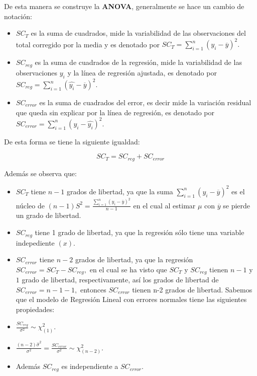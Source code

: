 \documentclass[
  a4paper,
  oneside,
  openany]{book}
\begin{document}
De esta manera se construye la \textbf{ANOVA}, generalmente se hace un cambio de notación:

\begin{itemize}
\item
  \(SC_{T}\) es la suma de cuadrados, mide la variabilidad de las observaciones del total corregido por la media y es denotado por \(SC_{T}=\sum_{i=1}^{n}(y_{i}-\overline{y})^2.\)
\item
  \(SC_{reg}\) es la suma de cuadrados de la regresión, mide la variabilidad de las observaciones \(y_{i}\) y la línea de regresión ajustada, es denotado por \(SC_{reg}=\sum_{i=1}^{n}(\hat{y_{i}}-\overline{y})^2.\)
\item
  \(SC_{error}\) es la suma de cuadrados del error, es decir mide la variación residual que queda sin explicar por la línea de regresión, es denotado por \(SC_{error}=\sum_{i=1}^{n}(y_{i}-\hat{y_{i}})^2.\)
\end{itemize}

De esta forma se tiene la siguiente igualdad:

\[SC_{T}=SC_{reg}+SC_{error}\]

Además se observa que:

\begin{itemize}
\item
  \(SC_{T}\) tiene \(n-1\) grados de libertad, ya que la suma \(\sum_{i=1}^{n}(y_{i}-\overline{y})^2\) es el núcleo de \((n-1)S^2=\frac{\sum_{i=1}^{n}(y_{i}-\overline{y})^2}{n-1}\) en el cual al estimar \(\mu\) con \(\overline{y}\) se pierde un grado de libertad.
\item
  \(SC_{reg}\) tiene 1 grado de libertad, ya que la regresión sólo tiene una variable indepediente \((x).\)
\item
  \(SC_{error}\) tiene \(n-2\) grados de libertad, ya que la regresión \(SC_{error}=SC_{T}-SC_{reg},\) en el cual se ha visto que \(SC_{T}\) y \(SC_{reg}\) tienen \(n-1\) y \(1\) grado de libertad, respectivamente, así los grados de libertad de \(SC_{error}=n-1-1,\) entonces \(SC_{error}\) tienen n-2 grados de libertad.
  Sabemos que el modelo de Regresión Lineal con errores normales tiene las siguientes propiedades:
\item
  \(\frac{SC_{reg}}{\sigma^2}\sim \chi^2_{(1)}.\)
\item
  \(\frac{(n-2)\hat{\sigma}^2}{\sigma^2}=\frac{SC_{error}}{\sigma^2}\sim\chi^2_{(n-2)}.\)
\item
  Además \(SC_{reg}\) es independiente a \(SC_{error}.\)
\end{itemize}
\end{document}
